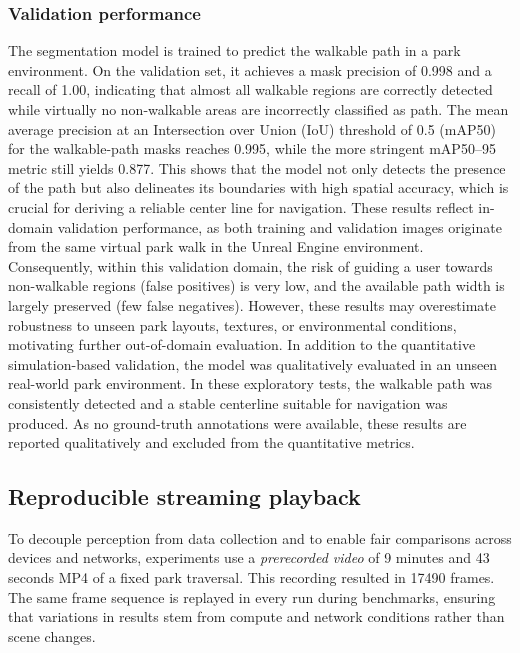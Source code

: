 \documentclass{ieeeaccess}
\begin{document}
\subsubsection{Validation performance}
The segmentation model is trained to predict the walkable path in a park environment. On the validation set, it achieves a mask precision of 0.998 and a recall of 1.00, indicating that almost all walkable regions are correctly detected while virtually no non-walkable areas are incorrectly classified as path. The mean average precision at an Intersection over Union (IoU) threshold of 0.5 (mAP50) for the walkable-path masks reaches 0.995, while the more stringent mAP50–95 metric still yields 0.877. This shows that the model not only detects the presence of the path but also delineates its boundaries with high spatial accuracy, which is crucial for deriving a reliable center line for navigation. These results reflect in-domain validation performance, as both training and validation images originate from the same virtual park walk in the Unreal Engine environment. Consequently, within this validation domain, the risk of guiding a user towards non-walkable regions (false positives) is very low, and the available path width is largely preserved (few false negatives). However, these results may overestimate robustness to unseen park layouts, textures, or environmental conditions, motivating further out-of-domain evaluation.
In addition to the quantitative simulation-based validation, the model was qualitatively evaluated in an unseen real-world park environment. In these exploratory tests, the walkable path was consistently detected and a stable centerline suitable for navigation was produced. As no ground-truth annotations were available, these results are reported qualitatively and excluded from the quantitative metrics.


\subsection{Reproducible streaming playback}
\label{sec:streamingPlayback}
To decouple perception from data collection and to enable fair comparisons across devices and networks, experiments use a \emph{prerecorded video} of 9 minutes and 43 seconds MP4 of a fixed park traversal. This recording resulted in 17490 frames. The same frame sequence is replayed in every run during benchmarks, ensuring that variations in results stem from compute and network conditions rather than scene changes.
\end{document}
